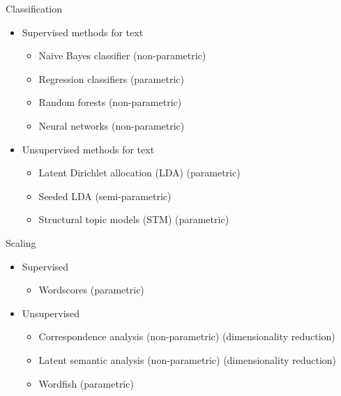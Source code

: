 \documentclass[pdf, 9pt, fleqn, handout]{beamer}
\begin{document}
\begin{frame}{Classification}
\begin{itemize}
\item Supervised methods for text \\[0.5em]
\begin{itemize}
\item Naive Bayes classifier (non-parametric) \\[0.5em]
\item Regression classifiers (parametric) \\[0.5em]
\item Random forests (non-parametric) \\[0.5em]
\item Neural networks (non-parametric) \\[2em]
\end{itemize}
\item Unsupervised methods for text \\[0.5em]
\begin{itemize}
\item Latent Dirichlet allocation (LDA) (parametric) \\[0.5em]
\item Seeded LDA  (semi-parametric) \\[0.5em]
\item Structural topic models (STM) (parametric)
\end{itemize} 
\end{itemize}
\end{frame}

\begin{frame}{Scaling}
\begin{itemize}
\item Supervised \\[0.5em]
\begin{itemize}
\item Wordscores (parametric) \\[3em]
\end{itemize}
\item Unsupervised \\[0.5em]
\begin{itemize}
\item Correspondence analysis (non-parametric) (dimensionality reduction) \\[1em]
\item Latent semantic analysis (non-parametric) (dimensionality reduction) \\[1em]
\item Wordfish (parametric)
\end{itemize}
\end{itemize}
\end{frame}
\end{document}

